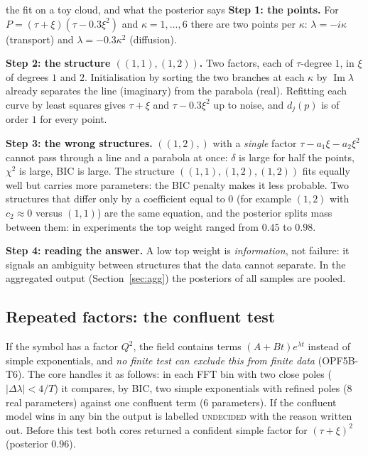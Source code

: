 \begin{explained}{the fit on a toy cloud, and what the posterior says}
\textbf{Step 1: the points.} For $P=(\tau+\xi)(\tau-0.3\xi^2)$ and $\kappa=1,\dots,6$ there are two points per $\kappa$: $\lambda=-i\kappa$ (transport) and $\lambda=-0.3\kappa^2$ (diffusion).

\medskip\textbf{Step 2: the structure $((1,1),(1,2))$.} Two factors, each of $\tau$-degree $1$, in $\xi$ of degrees $1$ and $2$. Initialisation by sorting the two branches at each $\kappa$ by $\operatorname{Im}\lambda$ already separates the line (imaginary) from the parabola (real). Refitting each curve by least squares gives $\tau+\xi$ and $\tau-0.3\xi^2$ up to noise, and $d_j(p)$ is of order $1$ for every point.

\medskip\textbf{Step 3: the wrong structures.} $((1,2),)$ with a \emph{single} factor $\tau-a_1\xi-a_2\xi^2$ cannot pass through a line and a parabola at once: $\delta$ is large for half the points, $\chi^2$ is large, BIC is large. The structure $((1,1),(1,2),(1,2))$ fits equally well but carries more parameters: the BIC penalty makes it less probable. Two structures that differ only by a coefficient equal to $0$ (for example $(1,2)$ with $c_2\approx0$ versus $(1,1)$) are the same equation, and the posterior splits mass between them: in experiments the top weight ranged from $0.45$ to $0.98$.

\medskip\textbf{Step 4: reading the answer.} A low top weight is \emph{information}, not failure: it signals an ambiguity between structures that the data cannot separate. In the aggregated output (Section~\ref{sec:agg}) the posteriors of all samples are pooled.
\end{explained}

\subsection{Repeated factors: the confluent test}\label{sec:confluent}
If the symbol has a factor $Q^2$, the field contains terms $(A+Bt)e^{\lambda t}$ instead of simple exponentials, and \emph{no finite test can exclude this from finite data} (OPF5B-T6). The core handles it as follows: in each FFT bin with two close poles ($|\Delta\lambda|<4/T$) it compares, by BIC, two simple exponentials with refined poles (8 real parameters) against one confluent term (6 parameters). If the confluent model wins in any bin the output is labelled \textsc{undecided} with the reason written out. Before this test both cores returned a confident simple factor for $(\tau+\xi)^2$ (posterior $0.96$).

